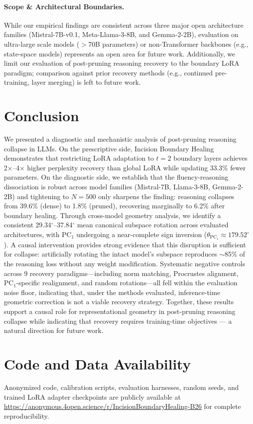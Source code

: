 \documentclass[11pt]{article}
\begin{document}
\paragraph{Scope \& Architectural Boundaries.}
While our empirical findings are consistent across three major open architecture families (Mistral-7B-v0.1, Meta-Llama-3-8B, and Gemma-2-2B), evaluation on ultra-large scale models ($>$70B parameters) or non-Transformer backbones (e.g., state-space models) represents an open area for future work. Additionally, we limit our evaluation of post-pruning reasoning recovery to the boundary LoRA paradigm; comparison against prior recovery methods (e.g., continued pre-training, layer merging) is left to future work.

\section{Conclusion}

We presented a diagnostic and mechanistic analysis of post-pruning reasoning collapse in LLMs. On the prescriptive side, Incision Boundary Healing demonstrates that restricting LoRA adaptation to $t=2$ boundary layers achieves 2$\times$--4$\times$ higher perplexity recovery than global LoRA while updating 33.3\% fewer parameters. On the diagnostic side, we establish that the fluency-reasoning dissociation is robust across model families (Mistral-7B, Llama-3-8B, Gemma-2-2B) and tightening to $N=500$ only sharpens the finding: reasoning collapses from 39.6\% (dense) to 1.8\% (pruned), recovering marginally to 6.2\% after boundary healing. Through cross-model geometry analysis, we identify a consistent 29.34$^\circ$--37.84$^\circ$ mean canonical subspace rotation across evaluated architectures, with PC$_1$ undergoing a near-complete sign inversion ($\theta_{\mathrm{PC}_1} \approx 179.52^\circ$). A causal intervention provides strong evidence that this disruption is sufficient for collapse: artificially rotating the intact model's subspace reproduces $\sim$85\% of the reasoning loss without any weight modification. Systematic negative controls across 9 recovery paradigms---including norm matching, Procrustes alignment, PC$_1$-specific realignment, and random rotations---all fell within the evaluation noise floor, indicating that, under the methods evaluated, inference-time geometric correction is not a viable recovery strategy. Together, these results support a causal role for representational geometry in post-pruning reasoning collapse while indicating that recovery requires training-time objectives --- a natural direction for future work.

\section*{Code and Data Availability}
Anonymized code, calibration scripts, evaluation harnesses, random seeds, and trained LoRA adapter checkpoints are publicly available at \url{https://anonymous.4open.science/r/IncisionBoundaryHealing-B26} for complete reproducibility.


\end{document}
